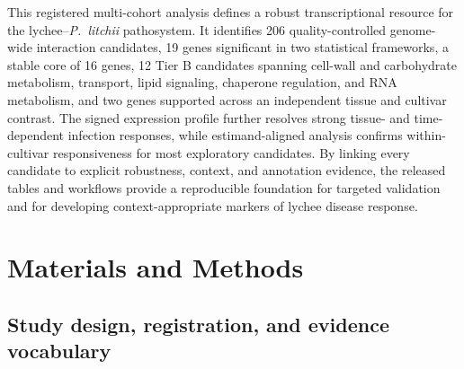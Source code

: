 \documentclass[11pt]{article}
\newcommand{\Pl}{\textit{P.~litchii}}
\begin{document}
This registered multi-cohort analysis defines a robust transcriptional resource for the lychee--\Pl{} pathosystem. It identifies 206 quality-controlled genome-wide interaction candidates, 19 genes significant in two statistical frameworks, a stable core of 16 genes, 12 Tier B candidates spanning cell-wall and carbohydrate metabolism, transport, lipid signaling, chaperone regulation, and RNA metabolism, and two genes supported across an independent tissue and cultivar contrast. The signed expression profile further resolves strong tissue- and time-dependent infection responses, while estimand-aligned analysis confirms within-cultivar responsiveness for most exploratory candidates. By linking every candidate to explicit robustness, context, and annotation evidence, the released tables and workflows provide a reproducible foundation for targeted validation and for developing context-appropriate markers of lychee disease response.

\section{Materials and Methods}

\subsection{Study design, registration, and evidence vocabulary}
\end{document}
